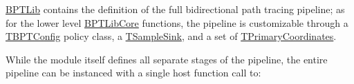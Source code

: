 \begin{DoxyParagraph}{}
\hyperlink{group___b_p_t_lib}{B\+P\+T\+Lib} contains the definition of the full bidirectional path tracing pipeline; as for the lower level \hyperlink{group___b_p_t_lib_core}{B\+P\+T\+Lib\+Core} functions, the pipeline is customizable through a \hyperlink{_b_p_t_lib_page_TBPTConfig}{T\+B\+P\+T\+Config} policy class, a \hyperlink{_b_p_t_lib_page_TSampleSink}{T\+Sample\+Sink}, and a set of \hyperlink{_b_p_t_lib_page_TPrimaryCoordinates}{T\+Primary\+Coordinates}. 
\end{DoxyParagraph}
\begin{DoxyParagraph}{}
While the module itself defines all separate stages of the pipeline, the entire pipeline can be instanced with a single host function call to\+:
\end{DoxyParagraph}
\label{_b_p_t_lib_page_sample_paths_anchor}%
%

